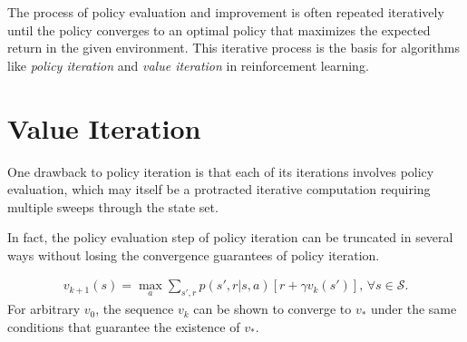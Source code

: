 The process of policy evaluation and improvement is often repeated iteratively until the policy converges to an optimal policy that maximizes the expected return in the given environment. This iterative process is the basis for algorithms like \textit{policy iteration} and \textit{value iteration} in reinforcement learning.


\section{Value Iteration}
One drawback to policy iteration is that each of its iterations involves policy evaluation, which may itself be a protracted iterative computation requiring multiple sweeps through the state set.

In fact, the policy evaluation step of policy iteration can be truncated in several ways without losing the convergence guarantees of policy iteration.

\begin{align}
	v_{k+1}(s)=\max_a \sum_{s',r}p(s',r|s,a)[r + \gamma v_k(s')], \, \forall s\in \mathcal{S}.
	\label{eq:value_iteration}
\end{align}
For arbitrary $v_0$, the sequence $v_k$ can be shown to converge to $v_*$ under the same conditions that guarantee the existence of $v_*$.

